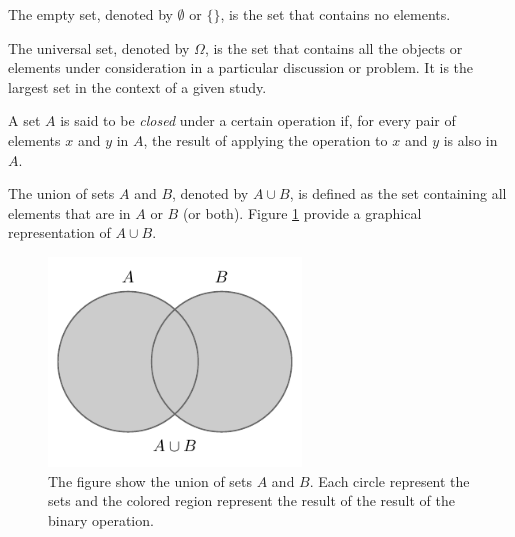 \begin{definition}
	The empty set, denoted by $\emptyset$ or $\{\}$, is the set that contains no elements.
\end{definition}

\begin{definition}
	The universal set, denoted by $\Omega$, is the set that contains all the objects or elements under consideration in a particular discussion or problem. It is the largest set in the context of a given study.
\end{definition}

\begin{definition}[Closure]
	A set $A$ is said to be \textit{closed} under a certain operation if, for every pair of elements $x$ and $y$ in $A$, the result of applying the operation to $x$ and $y$ is also in $A$.
\end{definition}

\begin{definition}[Union]
	The union of sets $A$ and $B$, denoted by $A \cup B$, is defined as the set containing all elements that are in $A$ or $B$ (or both). Figure \ref{fig:set_union} provide a graphical representation of $A \cup B$.
	\begin{figure}[h]
		\centering
		\includegraphics[width = 0.6\textwidth]{figures/set_union.pdf}
		\caption{The figure show the union of sets $A$ and $B$. Each circle represent the sets and the colored region represent the result of the result of the binary operation.}
		\label{fig:set_union}
	\end{figure}
\end{definition}

